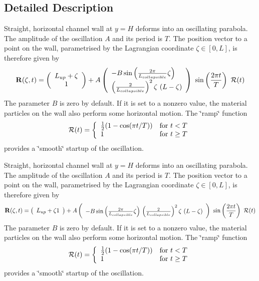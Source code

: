 \subsection{Detailed Description}
Straight, horizontal channel wall at $ y=H $ deforms into an oscillating parabola. The amplitude of the oscillation $ A $ and its period is $ T $. The position vector to a point on the wall, parametrised by the Lagrangian coordinate $ \zeta \in [0,L]$, is therefore given by \[ {\bf R}(\zeta,t) = \left( \begin{array}{c} L_{up} + \zeta \\ 1 \end{array} \right) + A \left( \begin{array}{l} - B \sin\left(\frac{2\pi}{L_{collapsible}}\zeta\right) \\ \left( \frac{2}{L_{collapsible}}\right)^2 \zeta \ (L-\zeta) \end{array} \right) \ \sin\left(\frac{2\pi t}{T}\right) \ {\cal R}(t) \] The parameter $ B $ is zero by default. If it is set to a nonzero value, the material particles on the wall also perform some horizontal motion. The \char`\"{}ramp\char`\"{} function \[ {\cal R}(t) = \left\{ \begin{array}{ll} \frac{1}{2}(1-\cos(\pi t/T)) & \mbox{for $t<T$} \\ 1 & \mbox{for $t \ge T$} \end{array} \right. \] provides a \char`\"{}smooth\char`\"{} startup of the oscillation.

Straight, horizontal channel wall at $ y=H $ deforms into an oscillating parabola. The amplitude of the oscillation $ A $ and its period is $ T $. The position vector to a point on the wall, parametrised by the Lagrangian coordinate $ \zeta \in [0,L]$, is therefore given by \[ {\bf R}(\zeta,t) = \left( \begin{array}{c} L_{up} + \zeta \newline 1 \end{array} \right) + A \left( \begin{array}{l} - B \sin\left(\frac{2\pi}{L_{collapsible}}\zeta\right) \newline \left(\frac{2}{L_{collapsible}}\right)^2 \zeta \ (L-\zeta) \end{array} \right) \ \sin\left(\frac{2\pi t}{T}\right) \ {\cal R}(t) \] The parameter $ B $ is zero by default. If it is set to a nonzero value, the material particles on the wall also perform some horizontal motion. The \char`\"{}ramp\char`\"{} function \[ {\cal R}(t) = \left\{ \begin{array}{ll} \frac{1}{2}(1-\cos(\pi t/T)) & \mbox{for $t<T$} \\ 1 & \mbox{for $t \ge T$} \end{array} \right. \] provides a \char`\"{}smooth\char`\"{} startup of the oscillation. 

